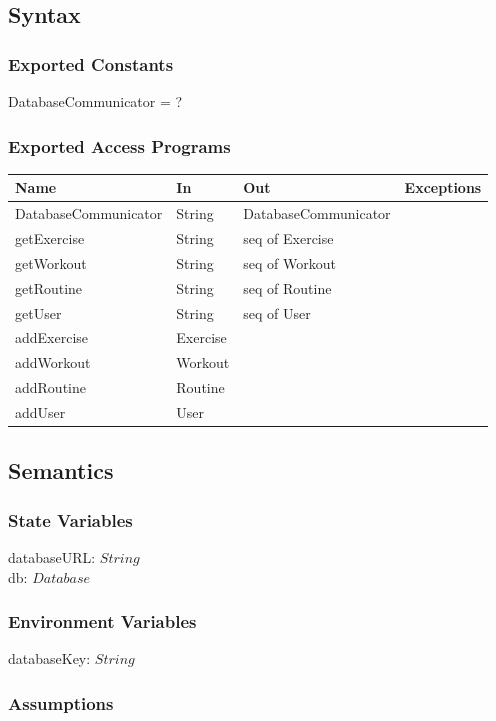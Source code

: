 \documentclass[12pt, titlepage]{article}
\begin{document}
\subsection{Syntax}

\subsubsection{Exported Constants}
DatabaseCommunicator = ?
\subsubsection{Exported Access Programs}

\begin{center}
	\begin{tabular}{p{4cm} p{4cm} p{4cm} p{2cm}}
		\hline
		\textbf{Name} & \textbf{In} & \textbf{Out} & \textbf{Exceptions} \\
		\hline
		DatabaseCommunicator & String & DatabaseCommunicator &  \\
		getExercise & String & seq of Exercise &  \\
		getWorkout & String & seq of Workout &  \\
		getRoutine & String & seq of Routine &  \\
		getUser & String & seq of User &  \\
		addExercise & Exercise &  &  \\
		addWorkout & Workout &  &  \\
		addRoutine & Routine &  &  \\
		addUser & User &  &  \\
		\hline
	\end{tabular}
\end{center}

\subsection{Semantics}

\subsubsection{State Variables}
databaseURL: $String$ \\
db: $Database$
\subsubsection{Environment Variables}
databaseKey: $String$
\subsubsection{Assumptions}
\end{document}
